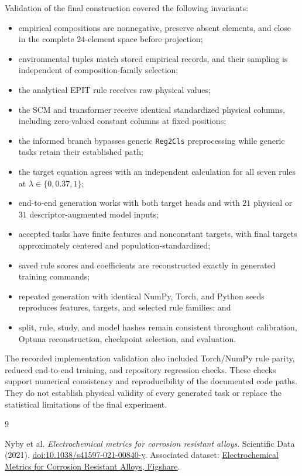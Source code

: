 \documentclass{article}
\begin{document}
Validation of the final construction covered the following invariants:
\begin{itemize}
    \item empirical compositions are nonnegative, preserve absent elements,
    and close in the complete \(24\)-element space before projection;
    \item environmental tuples match stored empirical records, and their
    sampling is independent of composition-family selection;
    \item the analytical EPIT rule receives raw physical values;
    \item the SCM and transformer receive identical standardized physical
    columns, including zero-valued constant columns at fixed positions;
    \item the informed branch bypasses generic \texttt{Reg2Cls}
    preprocessing while generic tasks retain their established path;
    \item the target equation agrees with an independent calculation for all
    seven rules at \(\lambda\in\{0,0.37,1\}\);
    \item end-to-end generation works with both target heads and with
    \(21\) physical or \(31\) descriptor-augmented model inputs;
    \item accepted tasks have finite features and nonconstant targets, with
    final targets approximately centered and population-standardized;
    \item saved rule scores and coefficients are reconstructed exactly in
    generated training commands;
    \item repeated generation with identical NumPy, Torch, and Python seeds
    reproduces features, targets, and selected rule families; and
    \item split, rule, study, and model hashes remain consistent throughout
    calibration, Optuna reconstruction, checkpoint selection, and evaluation.
\end{itemize}

The recorded implementation validation also included Torch/NumPy rule parity,
reduced end-to-end training, and repository regression checks. These checks
support numerical consistency and reproducibility of the documented code
paths. They do not establish physical validity of every generated task or
replace the statistical limitations of the final experiment.

\begin{thebibliography}{9}
\raggedright
{}
Nyby et al.
\textit{Electrochemical metrics for corrosion resistant alloys}.
Scientific Data (2021).
\href{https://doi.org/10.1038/s41597-021-00840-y}{doi:10.1038/s41597-021-00840-y}.
Associated dataset:
\href{https://figshare.com/articles/dataset/Electrochemical_Metrics_for_Corrosion_Resistant_Alloys/13038257}{Electrochemical Metrics for Corrosion Resistant Alloys, Figshare}.
\end{thebibliography}
\end{document}
